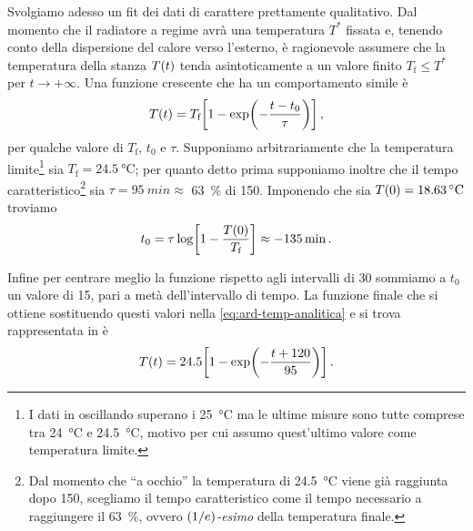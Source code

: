             Svolgiamo adesso un fit dei dati di carattere prettamente qualitativo. Dal momento che il radiatore a regime avrà una temperatura $T^*$ fissata e, tenendo conto della dispersione del calore verso l'esterno, è ragionevole assumere che la temperatura della stanza $T\pqty{t}$ tenda asintoticamente a un valore finito $T_\text{f} \leq T^*$ per $t\to+\infty$. Una funzione crescente che ha un comportamento simile è
            \begin{equation}
                T\pqty{t} = T_\text{f}\bqty{1 - \exp\!\pqty{-\frac{t - t_0}{\tau}}}
                \mycomma
                \label{eq:ard-temp-analitica}
            \end{equation}
            per qualche valore di $T_\text{f}$, $t_0$ e $\tau$. Supponiamo arbitrariamente che la temperatura limite\footnote{I dati in  oscillando superano i \SI{25}{\celsius} ma le ultime misure sono tutte comprese tra \SI{24}{\celsius} e \SI{24.5}{\celsius}, motivo per cui assumo quest'ultimo valore come temperatura limite.} sia $T_\text{f} = \SI{24.5}{\celsius}$; per quanto detto prima supponiamo inoltre che il tempo caratteristico\footnote{Dal momento che ``a occhio'' la temperatura di \SI{24.5}{\celsius} viene già raggiunta dopo \SI{150}{\min}, scegliamo il tempo caratteristico come il tempo necessario a raggiungere il \SI{63}{\%}, ovvero \textit{$\pqty{1/e}$-esimo} della temperatura finale.} sia $\tau = \SI{95}{min} \approx$ \SI{63}{\%} di \SI{150}{\min}. Imponendo che sia $T\pqty{0} = \SI{18.63}{\celsius}$ troviamo
            \begin{equation*}
                t_0
                = \tau \log\!\bqty{1-\frac{T\pqty{0}}{T_\text{f}}}
                \approx -\SI{135}{\min}
                \myperiod
            \end{equation*}

            Infine per centrare meglio la funzione rispetto agli intervalli di \SI{30}{\min} sommiamo a $t_0$ un valore di \SI{15}{\min}, pari a metà dell'intervallo di tempo. La funzione finale che si ottiene sostituendo questi valori nella \eqref{eq:ard-temp-analitica} e si trova rappresentata in  è
            \begin{equation}
                T\pqty{t} =  24.5 \bqty{1 - \exp\!\pqty{-\frac{t + 120}{95}}}
                \myperiod
                \label{eq:ard-temp-numerica}
            \end{equation}